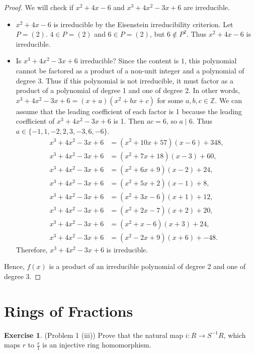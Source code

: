 \documentclass[12pt, psamsfonts]{amsart}
\theoremstyle{definition}
\newtheorem*{exer}{Exercise}
\theoremstyle{remark}
\numberwithin{equation}{section}
\begin{document}
\begin{proof}
  We will check if $x^2 + 4x - 6$ and $x^3 + 4x^2 - 3x + 6$ are irreducible.
  \begin{itemize}
    \item
      $x^2 + 4x - 6$ is irreducible by the Eisenstein irreducibility criterion.
      Let $P = (2)$.
      $4 \in P = (2)$ and $6 \in P = (2)$, but $6 \notin P^2$.
      Thus $x^2 + 4x - 6$ is irreducible.
    \item
      Is $x^3 + 4x^2 - 3x + 6$ irreducible?
      Since the content is $1$, this polynomial cannot be factored as a product of a non-unit integer and a polynomial of degree 3.
      Thus if this polynomial is not irreducible, it must factor as a product of a polynomial of degree 1 and one of degree 2.
      In other words, $x^3 + 4x^2 - 3x + 6 = (x + a)(x^2 + bx + c)$ for some $a, b, c \in \mathbb{Z}$.
      We can assume that the leading coefficient of each factor is 1 because the leading coefficient of $x^3 + 4x^2 - 3x + 6$ is 1.
      Then $ac = 6$, so $a \mid 6$.
      Thus $a \in \{ -1, 1, -2, 2, 3, -3, 6, -6 \}$.
      \begin{align*}
        x^3 + 4x^2 - 3x + 6 &= (x^{2} + 10 x + 57)(x - 6) + 348, \\
        x^3 + 4x^2 - 3x + 6 &= (x^{2} + 7 x + 18)(x - 3) + 60, \\
        x^3 + 4x^2 - 3x + 6 &= (x^{2} + 6 x + 9)(x - 2) + 24, \\
        x^3 + 4x^2 - 3x + 6 &= (x^{2} + 5 x + 2)(x - 1) + 8, \\
        x^3 + 4x^2 - 3x + 6 &= (x^{2} + 3 x - 6)(x + 1) + 12, \\
        x^3 + 4x^2 - 3x + 6 &= (x^{2} + 2 x - 7)(x + 2) + 20, \\
        x^3 + 4x^2 - 3x + 6 &= (x^{2} + x - 6)(x + 3) + 24, \\
        x^3 + 4x^2 - 3x + 6 &= (x^{2} - 2 x + 9)(x + 6) + -48.
      \end{align*}
      Therefore, $x^3 + 4x^2 - 3x + 6$ is irreducible.
  \end{itemize}
  Hence, $f(x)$ is a product of an irreducible polynomial of degree 2 and one of degree 3.
\end{proof}

\section{Rings of Fractions}
\begin{exer}{(Problem 1 (iii))}
  Prove that the natural map $i: R \rightarrow S^{-1}R$, which maps $r$ to $\frac{r}{1}$ is an injective ring homomorphism.
\end{exer}
\end{document}
